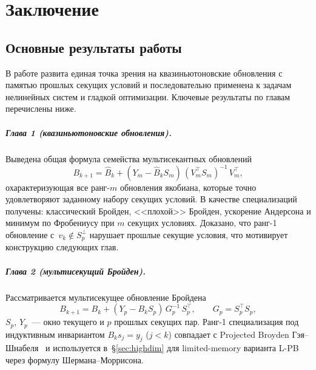 
\chapter*{Заключение}

\section*{Основные результаты работы}

В работе развита единая точка зрения на квазиньютоновские обновления
с памятью прошлых секущих условий и последовательно применена
к задачам нелинейных систем и гладкой оптимизации. Ключевые
результаты по главам перечислены ниже.

\paragraph{Глава 1 (квазиньютоновские обновления).}
Выведена общая формула семейства мультисекантных обновлений
\[
  B_{k+1} = \widehat{B}_k
    + (Y_m - \widehat{B}_k S_m)\,(V_m^\top S_m)^{-1}\,V_m^\top,
\]
охарактеризующая все ранг-$m$ обновления якобиана, которые точно
удовлетворяют заданному набору секущих условий. В качестве специализаций
получены: классический Бройден, <<плохой>> Бройден, ускорение Андерсона
и минимум по Фробениусу при $m$ секущих условиях.
Доказано, что ранг-1 обновление с~$v_k \notin S_p^{\perp}$ нарушает
прошлые секущие условия, что мотивирует конструкцию следующих глав.

\paragraph{Глава 2 (мультисекущий Бройден).}
Рассматривается мультисекущее обновление Бройдена~\cite{schnabel1983}
\[
  B_{k+1} = B_k + (Y_p - B_k S_p)\,G_p^{-1}\,S_p^\top,
  \qquad G_p = S_p^\top S_p,
\]
$S_p$, $Y_p$~--- окно текущего и $p$ прошлых секущих пар. Ранг-1
специализация под индуктивным инвариантом $B_k s_j = y_j$ ($j<k$)
совпадает с Projected Broyden Гэя--Шнабеля~\cite{gay_schnabel1978} и
используется в~\S\ref{sec:highdim} для limited-memory варианта L-PB
через формулу Шермана--Моррисона.

